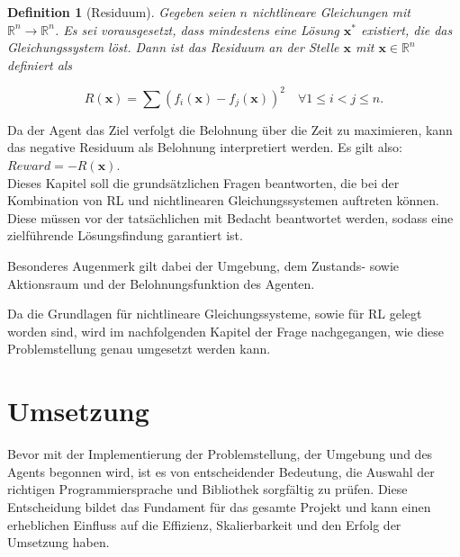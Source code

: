 \documentclass{article}
\theoremstyle{newline}
\newtheorem{definition}{Definition}[section]
\begin{document}
\begin{onehalfspace}
\begin{definition}[Residuum]
	Gegeben seien $n$ nichtlineare Gleichungen mit $\mathbb{R}^n \rightarrow \mathbb{R}^n$. Es sei vorausgesetzt, dass mindestens eine Lösung $\mathbf{x}^{\ast}$ existiert, die das Gleichungssystem löst. Dann ist das Residuum an der Stelle $\mathbf{x}$ mit $\mathbf{x} \in \mathbb{R}^n$ definiert als
	
	\begin{equation}
		R(\mathbf{x}) = \sum\limits (f_i(\mathbf{x}) - f_j(\mathbf{x}))^2 \quad \forall 1 \leq i < j \leq n.
	\end{equation}
\end{definition}

Da der Agent das Ziel verfolgt die Belohnung über die Zeit zu maximieren, kann das negative Residuum als Belohnung interpretiert werden. Es gilt also: $Reward = -R(\mathbf{x})$.
\\

Dieses Kapitel soll die grundsätzlichen Fragen beantworten, die bei der Kombination von RL und nichtlinearen Gleichungssystemen auftreten können. Diese müssen vor der tatsächlichen mit Bedacht beantwortet werden, sodass eine zielführende Lösungsfindung garantiert ist.

Besonderes Augenmerk gilt dabei der Umgebung, dem Zustands- sowie Aktionsraum und der Belohnungsfunktion des Agenten.

Da die Grundlagen für nichtlineare Gleichungssysteme, sowie für RL gelegt worden sind, wird im nachfolgenden Kapitel der Frage nachgegangen, wie diese Problemstellung genau umgesetzt werden kann.

\section{Umsetzung}

Bevor mit der Implementierung der Problemstellung, der Umgebung und des Agents begonnen wird, ist es von entscheidender Bedeutung, die Auswahl der richtigen Programmiersprache und Bibliothek sorgfältig zu prüfen. Diese Entscheidung bildet das Fundament für das gesamte Projekt und kann einen erheblichen Einfluss auf die Effizienz, Skalierbarkeit und den Erfolg der Umsetzung haben.
\medskip


\end{onehalfspace}
\end{document}
